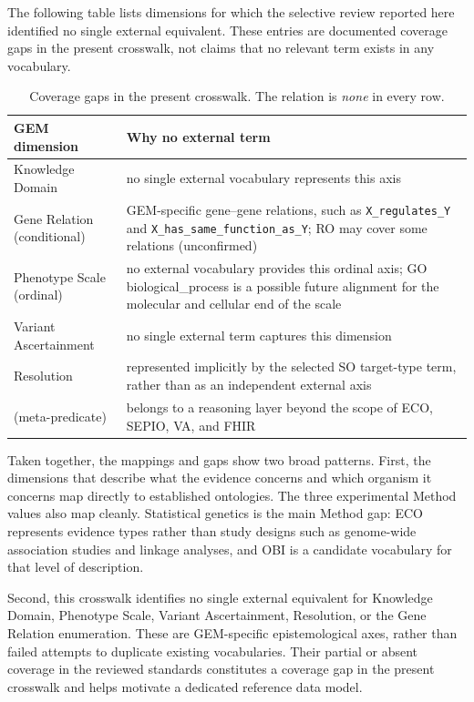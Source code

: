 The following table lists dimensions for which the selective review reported
here identified no single external equivalent. These entries are documented
coverage gaps in the present crosswalk, not claims that no relevant term
exists in any vocabulary.

\begin{table}[H]
  \centering
  \small
  \caption[Crosswalk: coverage gaps]{Coverage gaps in the present crosswalk.
  The relation is \emph{none} in every row.}
  \label{tab:xwalk-gaps}
  \begin{tabularx}{\linewidth}{@{}l >{\raggedright\arraybackslash}X@{}}
    \toprule
    GEM dimension & Why no external term \\
    \midrule
    Knowledge Domain & no single external vocabulary represents this axis \\
        Gene Relation (conditional) & GEM-specific gene--gene relations, such as \texttt{X\_regulates\_Y} and \texttt{X\_has\_same\_function\_as\_Y}; RO may cover some relations (unconfirmed) \\
        Phenotype Scale (ordinal) & no external vocabulary provides this ordinal axis; GO biological\_process is a possible future alignment for the molecular and cellular end of the scale \\
        Variant Ascertainment & no single external term captures this dimension \\
        Resolution & represented implicitly by the selected SO target-type term, rather than as an independent external axis \\
        \EvidenceAssertion{} (meta-predicate) & belongs to a reasoning layer beyond the scope of ECO, SEPIO, VA, and FHIR \\
    \bottomrule
  \end{tabularx}
\end{table}

Taken together, the mappings and gaps show two broad patterns. First, the
dimensions that describe what the evidence concerns and which organism it
concerns map directly to established ontologies. The three experimental
Method values also map cleanly. Statistical genetics is the main Method gap:
ECO represents evidence types rather than study designs such as genome-wide
association studies and linkage analyses, and OBI is a candidate vocabulary
for that level of description.

Second, this crosswalk identifies no single external equivalent for Knowledge
Domain, Phenotype Scale, Variant Ascertainment, Resolution, or the Gene
Relation enumeration. These are GEM-specific epistemological axes, rather
than failed attempts to duplicate existing vocabularies. Their partial or
absent coverage in the reviewed standards constitutes a coverage gap in the
present crosswalk and helps motivate a dedicated reference data model.
